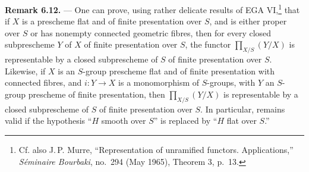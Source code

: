 \medskip
\noindent{}\textbf{Remark 6.12.} ---
One can prove, using rather delicate results of EGA
VI,\footnote{Cf. also J.\,P. Murre, ``Representation of unramified
functors. Applications,'' \emph{Séminaire Bourbaki}, no.\ 294
(May 1965), Theorem 3, p.\ 13.} that if \(X\) is a prescheme flat
and of finite presentation over \(S\), and is either proper over
\(S\) or has nonempty connected geometric fibres, then for every
closed subprescheme \(Y\) of \(X\) of finite presentation over
\(S\), the functor \(\prod_{X/S}(Y/X)\) is representable by a closed
subprescheme of \(S\) of finite presentation over \(S\).  Likewise,
if \(X\) is an \(S\)-group prescheme flat and of finite presentation
with connected fibres, and \(i:Y\to X\) is a monomorphism of
\(S\)-groups, with \(Y\) an \(S\)-group prescheme of finite
presentation, then \(\prod_{X/S}(Y/X)\) is representable by a closed
subprescheme of \(S\) of finite presentation over \(S\).  In
particular, 
remains valid if the hypothesis ``\(H\) smooth over \(S\)'' is
replaced by ``\(H\) flat over \(S\).''

